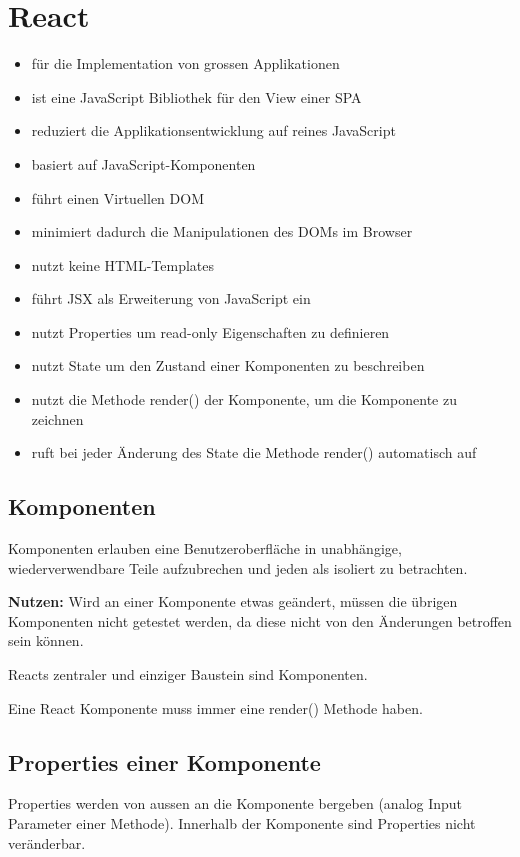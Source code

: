 \section{React}

\begin{itemize}
	\item für die Implementation von grossen Applikationen
	\item ist eine JavaScript Bibliothek für den View einer SPA
	\item reduziert die Applikationsentwicklung auf reines JavaScript
	\item basiert auf JavaScript-Komponenten
	\item führt einen Virtuellen DOM
	\item minimiert dadurch die Manipulationen des DOMs im Browser
	\item nutzt keine HTML-Templates
	\item führt JSX als Erweiterung von JavaScript ein
	\item nutzt Properties um read-only Eigenschaften zu definieren
	\item nutzt State um den Zustand einer Komponenten zu beschreiben
	\item nutzt die Methode render() der Komponente, um die Komponente zu zeichnen
	\item ruft bei jeder Änderung des State die Methode render() automatisch auf
\end{itemize}

\subsection{Komponenten}
Komponenten erlauben eine Benutzeroberfläche in unabhängige, wiederverwendbare Teile aufzubrechen und jeden als isoliert zu betrachten.

\textbf{Nutzen:} Wird an einer Komponente etwas geändert, müssen die übrigen Komponenten nicht getestet werden, da diese nicht von den Änderungen betroffen sein können.

Reacts zentraler und einziger Baustein sind Komponenten.

Eine React Komponente muss immer eine render() Methode haben.

\subsection{Properties einer Komponente}

Properties werden von aussen an die Komponente bergeben (analog Input Parameter einer Methode). Innerhalb der Komponente sind Properties nicht veränderbar.

